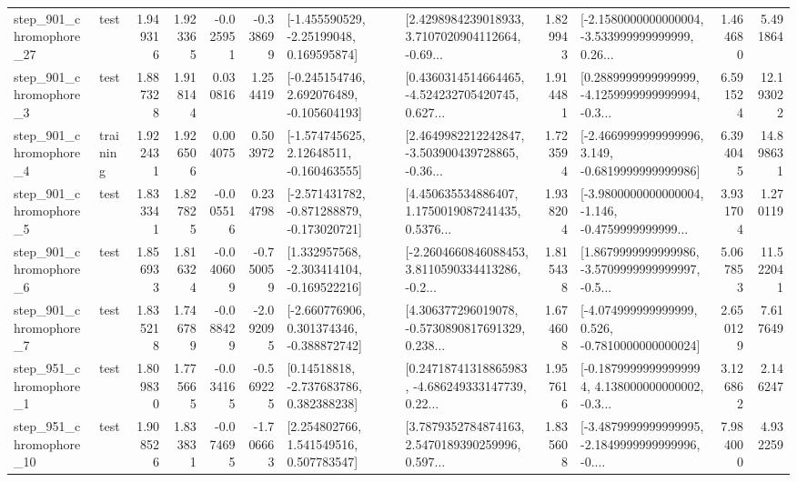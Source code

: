 \begin{tabular}{llrrrrllrlrr}
  step\_901\_chromophore\_27 &      test &      1.949316 &    1.923365 &     -0.025951 & -0.338699 &    [-1.455590529, -2.25199048, 0.169595874] &  [2.4298984239018933, 3.7107020904112664, -0.69... &       1.829943 &  [-2.1580000000000004, -3.533999999999999, 0.26... &            1.464680 &          5.491864 \\
   step\_901\_chromophore\_3 &      test &      1.887328 &    1.918144 &      0.030816 &  1.254419 &   [-0.245154746, 2.692076489, -0.105604193] &  [0.4360314514664465, -4.524232705420745, 0.627... &       1.914481 &  [0.2889999999999999, -4.1259999999999994, -0.3... &            6.591524 &         12.193022 \\
   step\_901\_chromophore\_4 &  training &      1.922431 &    1.926506 &      0.004075 &  0.503972 &    [-1.574745625, 2.12648511, -0.160463555] &  [2.4649982212242847, -3.503900439728865, -0.36... &       1.723594 &  [-2.4669999999999996, 3.149, -0.6819999999999986] &            6.394045 &         14.898631 \\
   step\_901\_chromophore\_5 &      test &      1.833341 &    1.827825 &     -0.005516 &  0.234798 &  [-2.571431782, -0.871288879, -0.173020721] &  [4.450635534886407, 1.1750019087241435, 0.5376... &       1.938204 &  [-3.9800000000000004, -1.146, -0.4759999999999... &            3.931704 &          1.270119 \\
   step\_901\_chromophore\_6 &      test &      1.856933 &    1.816324 &     -0.040609 & -0.750059 &   [1.332957568, -2.303414104, -0.169522216] &  [-2.2604660846088453, 3.8110590334413286, -0.2... &       1.815438 &  [1.8679999999999986, -3.5709999999999997, -0.5... &            5.067853 &         11.522041 \\
   step\_901\_chromophore\_7 &      test &      1.835218 &    1.746789 &     -0.088429 & -2.092095 &   [-2.660776906, 0.301374346, -0.388872742] &  [4.306377296019078, -0.5730890817691329, 0.238... &       1.674608 &   [-4.074999999999999, 0.526, -0.7810000000000024] &            2.650129 &          7.617649 \\
   step\_951\_chromophore\_1 &      test &      1.809830 &    1.775665 &     -0.034165 & -0.569225 &     [0.14518818, -2.737683786, 0.382388238] &  [0.24718741318865983, -4.686249333147739, 0.22... &       1.957616 &  [-0.18799999999999994, 4.138000000000002, -0.3... &            3.126862 &          2.146247 \\
  step\_951\_chromophore\_10 &      test &      1.908526 &    1.833831 &     -0.074695 & -1.706663 &     [2.254802766, 1.541549516, 0.507783547] &  [3.7879352784874163, 2.5470189390259996, 0.597... &       1.835608 &  [-3.4879999999999995, -2.1849999999999996, -0.... &            7.984000 &          4.932259 \\

\end{tabular}

